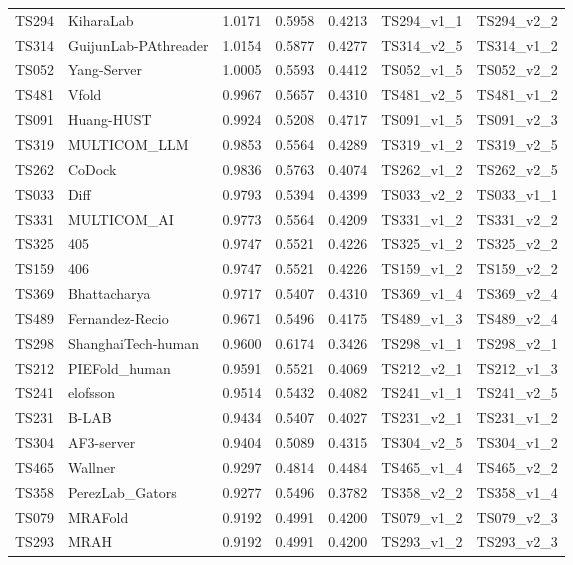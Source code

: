 \begin{table}[ht]
{\begin{tabular}{llrrrll}
TS294 & KiharaLab & 1.0171 & 0.5958 & 0.4213 & TS294\_v1\_1 & TS294\_v2\_2 \\ 
TS314 & GuijunLab-PAthreader & 1.0154 & 0.5877 & 0.4277 & TS314\_v2\_5 & TS314\_v1\_2 \\ 
TS052 & Yang-Server & 1.0005 & 0.5593 & 0.4412 & TS052\_v1\_5 & TS052\_v2\_2 \\ 
TS481 & Vfold & 0.9967 & 0.5657 & 0.4310 & TS481\_v2\_5 & TS481\_v1\_2 \\ 
TS091 & Huang-HUST & 0.9924 & 0.5208 & 0.4717 & TS091\_v1\_5 & TS091\_v2\_3 \\ 
TS319 & MULTICOM\_LLM & 0.9853 & 0.5564 & 0.4289 & TS319\_v1\_2 & TS319\_v2\_5 \\ 
TS262 & CoDock & 0.9836 & 0.5763 & 0.4074 & TS262\_v1\_2 & TS262\_v2\_5 \\ 
TS033 & Diff & 0.9793 & 0.5394 & 0.4399 & TS033\_v2\_2 & TS033\_v1\_1 \\ 
TS331 & MULTICOM\_AI & 0.9773 & 0.5564 & 0.4209 & TS331\_v1\_2 & TS331\_v2\_2 \\ 
TS325 & 405 & 0.9747 & 0.5521 & 0.4226 & TS325\_v1\_2 & TS325\_v2\_2 \\ 
TS159 & 406 & 0.9747 & 0.5521 & 0.4226 & TS159\_v1\_2 & TS159\_v2\_2 \\ 
TS369 & Bhattacharya & 0.9717 & 0.5407 & 0.4310 & TS369\_v1\_4 & TS369\_v2\_4 \\ 
TS489 & Fernandez-Recio & 0.9671 & 0.5496 & 0.4175 & TS489\_v1\_3 & TS489\_v2\_4 \\ 
TS298 & ShanghaiTech-human & 0.9600 & 0.6174 & 0.3426 & TS298\_v1\_1 & TS298\_v2\_1 \\ 
TS212 & PIEFold\_human & 0.9591 & 0.5521 & 0.4069 & TS212\_v2\_1 & TS212\_v1\_3 \\ 
TS241 & elofsson & 0.9514 & 0.5432 & 0.4082 & TS241\_v1\_1 & TS241\_v2\_5 \\ 
TS231 & B-LAB & 0.9434 & 0.5407 & 0.4027 & TS231\_v2\_1 & TS231\_v1\_2 \\ 
TS304 & AF3-server & 0.9404 & 0.5089 & 0.4315 & TS304\_v2\_5 & TS304\_v1\_2 \\ 
TS465 & Wallner & 0.9297 & 0.4814 & 0.4484 & TS465\_v1\_4 & TS465\_v2\_2 \\ 
TS358 & PerezLab\_Gators & 0.9277 & 0.5496 & 0.3782 & TS358\_v2\_2 & TS358\_v1\_4 \\ 
TS079 & MRAFold & 0.9192 & 0.4991 & 0.4200 & TS079\_v1\_2 & TS079\_v2\_3 \\ 
TS293 & MRAH & 0.9192 & 0.4991 & 0.4200 & TS293\_v1\_2 & TS293\_v2\_3 \\ 

\end{tabular}}
\end{table}
